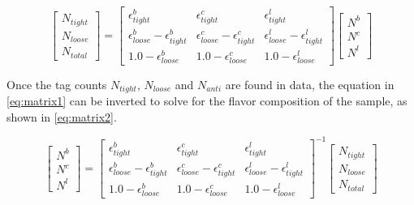         \begin{equation}
            \begin{bmatrix} \scriptstyle
            N_{tight} \\ \scriptstyle
            N_{loose} \\ \scriptstyle
            N_{total}
            \end{bmatrix}    
            = 
            \begin{bmatrix} \scriptstyle
                \epsilon^b_{tight} & \scriptstyle \epsilon^c_{tight} & \scriptstyle \epsilon^l_{tight} \\  \scriptstyle
                \epsilon^b_{loose} - \epsilon^b_{tight} & \scriptstyle \epsilon^c_{loose} - \epsilon^c_{tight} & \scriptstyle \epsilon^l_{loose} - \epsilon^l_{tight} \\      \scriptstyle
                1.0 - \epsilon^b_{loose} & \scriptstyle 1.0 - \epsilon^c_{loose} & \scriptstyle  1.0 - \epsilon^l_{loose}
            \end{bmatrix}
            \begin{bmatrix} \scriptstyle
                N^b \\ \scriptstyle
                N^c \\ \scriptstyle
                N^l
            \end{bmatrix}
        \label{eq:matrix1} 
        \end{equation} %

Once the tag counts $N_{tight}$, $N_{loose}$ and $N_{anti}$ are found in data, the equation in \ref{eq:matrix1} can be inverted to solve for the flavor composition of the sample, as shown in \ref{eq:matrix2}.


        \begin{equation}
            \begin{bmatrix} \scriptstyle
                N^b \\ \scriptstyle
                N^c \\ \scriptstyle
                N^l
            \end{bmatrix} 
            = 
            \begin{bmatrix} \scriptstyle
                \epsilon^b_{tight} & \scriptstyle \epsilon^c_{tight} & \scriptstyle \epsilon^l_{tight} \\  \scriptstyle
                \epsilon^b_{loose} - \epsilon^b_{tight} & \scriptstyle \epsilon^c_{loose} - \epsilon^c_{tight} & \scriptstyle \epsilon^l_{loose} - \epsilon^l_{tight} \\      \scriptstyle
                1.0 - \epsilon^b_{loose} & \scriptstyle 1.0 - \epsilon^c_{loose} & \scriptstyle  1.0 - \epsilon^l_{loose}
            \end{bmatrix}
            ^{-1}
            \begin{bmatrix} \scriptstyle
            N_{tight} \\ \scriptstyle
            N_{loose} \\ \scriptstyle
            N_{total}
            \end{bmatrix}  
        \label{eq:matrix2} 
        \end{equation} %

